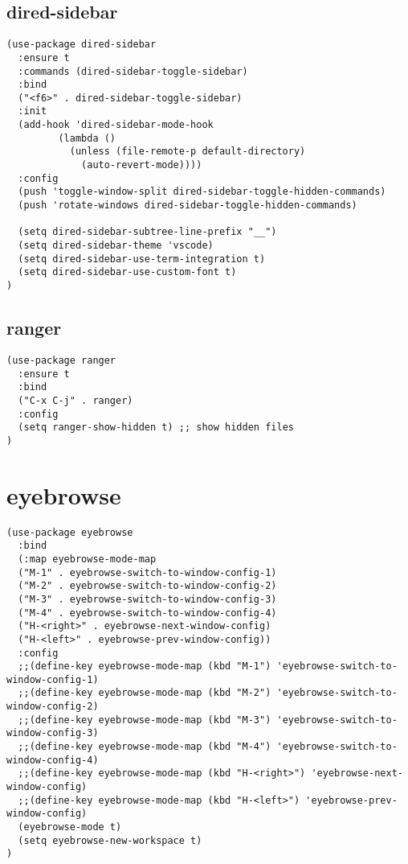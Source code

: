 \documentclass[11pt]{article}
\begin{document}
\subsection*{dired-sidebar}
\label{sec:orge04e152}

\begin{verbatim}
(use-package dired-sidebar
  :ensure t
  :commands (dired-sidebar-toggle-sidebar)
  :bind
  ("<f6>" . dired-sidebar-toggle-sidebar)
  :init
  (add-hook 'dired-sidebar-mode-hook
         (lambda ()
           (unless (file-remote-p default-directory)
             (auto-revert-mode))))
  :config
  (push 'toggle-window-split dired-sidebar-toggle-hidden-commands)
  (push 'rotate-windows dired-sidebar-toggle-hidden-commands)

  (setq dired-sidebar-subtree-line-prefix "__")
  (setq dired-sidebar-theme 'vscode)
  (setq dired-sidebar-use-term-integration t)
  (setq dired-sidebar-use-custom-font t)
)
\end{verbatim}

\subsection*{ranger}
\label{sec:orgee0f0c1}

\begin{verbatim}
(use-package ranger
  :ensure t
  :bind
  ("C-x C-j" . ranger)
  :config
  (setq ranger-show-hidden t) ;; show hidden files
)
\end{verbatim}


\section*{eyebrowse}
\label{sec:org389f4c6}
\begin{verbatim}
(use-package eyebrowse
  :bind
  (:map eyebrowse-mode-map
  ("M-1" . eyebrowse-switch-to-window-config-1)
  ("M-2" . eyebrowse-switch-to-window-config-2)
  ("M-3" . eyebrowse-switch-to-window-config-3)
  ("M-4" . eyebrowse-switch-to-window-config-4)
  ("H-<right>" . eyebrowse-next-window-config)
  ("H-<left>" . eyebrowse-prev-window-config))
  :config
  ;;(define-key eyebrowse-mode-map (kbd "M-1") 'eyebrowse-switch-to-window-config-1)
  ;;(define-key eyebrowse-mode-map (kbd "M-2") 'eyebrowse-switch-to-window-config-2)
  ;;(define-key eyebrowse-mode-map (kbd "M-3") 'eyebrowse-switch-to-window-config-3)
  ;;(define-key eyebrowse-mode-map (kbd "M-4") 'eyebrowse-switch-to-window-config-4)
  ;;(define-key eyebrowse-mode-map (kbd "H-<right>") 'eyebrowse-next-window-config)
  ;;(define-key eyebrowse-mode-map (kbd "H-<left>") 'eyebrowse-prev-window-config)
  (eyebrowse-mode t)
  (setq eyebrowse-new-workspace t)
)
\end{verbatim}
\end{document}
